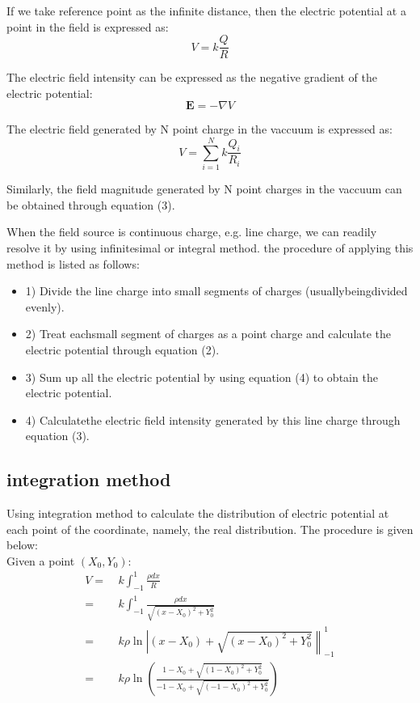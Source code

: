 \documentclass[10pt, journal, final]{IEEEtran}
\begin{document}
If we take reference point as the infinite distance, then the electric potential at
a point in the field is expressed as:
\begin{equation}
    V = k \frac{Q}{R}
\end{equation}

The electric field intensity can be expressed as the negative gradient of
the electric potential:
\begin{equation}
    \mathbf{E} = -\nabla V
\end{equation}

The electric field generated by N point charge in the vaccuum is expressed as:
\begin{equation}
    V = \sum_{i=1}^N k\frac{Q_i}{R_i}
\end{equation}

Similarly, the field magnitude generated by N point charges in the vaccuum can
be obtained through equation (3).\par

When the field source is continuous charge, e.g. line charge, we can readily resolve it
by using infinitesimal or integral method. the procedure of applying this method is
listed as follows:
\begin{itemize}
    \item 1) Divide the line charge into small segments of charges
          (usuallybeingdivided evenly).
    \item 2) Treat eachsmall segment of charges as a point charge and
          calculate the electric potential through equation (2).
    \item 3) Sum  up  all  the  electric  potential by using  equation  (4)
          to  obtain  the  electric potential.
    \item 4) Calculatethe electric field intensity generated by
          this line charge through equation (3).
\end{itemize}

\subsection{
    integration method
}\label{
    method:integration
}
Using integration method to calculate the distribution of electric potential
at each point of the coordinate, namely, the real distribution.
The procedure is given below:\\
Given a point $(X_0, Y_0)$:
\begin{equation}
    \begin{aligned}
        V= & \  k\int_{-1}^{1} \frac{\rho dx}{R}                                     \\
        =  & \ k\int_{-1}^{1} \frac{\rho dx}{\sqrt{(x-X_0)^2+Y_0^2}}                 \\
        =  & \ k \rho \ln{\left | (x-X_0)+\sqrt{(x-X_0)^2+Y_0^2} \right \|_{-1}^1  } \\
        =  & \  k \rho \ln{\left(
            \frac{1-X_0+\sqrt{(1-X_0)^2+Y_0^2}}{-1-X_0+\sqrt{(-1-X_0)^2+Y_0^2}}
            \right)}                                                                 \\
    \end{aligned}
\end{equation}
\end{document}
